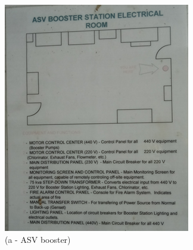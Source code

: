 \begin{figure}
	\begin{minipage}[b]{0.25\linewidth}
		\centering
				\includegraphics[width=\textwidth]{figures/fig_ch04_fdas_asv}
		\caption*{(a - ASV booster)}
	\end{minipage}
	\hspace{0.05cm}
	\begin{minipage}[b]{0.25\linewidth}
		\centering

\end{minipage}
\end{figure}
